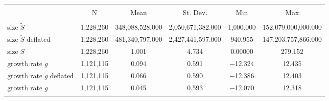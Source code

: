 
\begin{tabular}{@{\extracolsep{5pt}}lccccc} 
\\[-1.8ex]\hline 
\hline \\[-1.8ex] 
 & \multicolumn{1}{c}{N} & \multicolumn{1}{c}{Mean} & \multicolumn{1}{c}{St. Dev.} & \multicolumn{1}{c}{Min} & \multicolumn{1}{c}{Max} \\ 
\hline \\[-1.8ex] 
size $\tilde{S}$ & 1,228,260 & 348,088,528.000 & 2,050,671,382.000 & 1,000.000 & 152,079,000,000.000 \\ 
size $\tilde{S}$ deflated & 1,228,260 & 481,340,797.000 & 2,427,441,597.000 & 940.955 & 147,203,757,866.000 \\ 
size $S$ & 1,228,260 & 1.001 & 4.734 & 0.00000 & 279.152 \\ 
growth rate $\tilde{g}$ & 1,121,115 & 0.094 & 0.591 & $-$12.324 & 12.435 \\ 
growth rate $\tilde{g}$ deflated & 1,121,115 & 0.066 & 0.590 & $-$12.386 & 12.403 \\ 
growth rate $g$ & 1,121,115 & 0.045 & 0.593 & $-$12.070 & 12.318 \\ 
\hline \\[-1.8ex] 
\end{tabular} 
